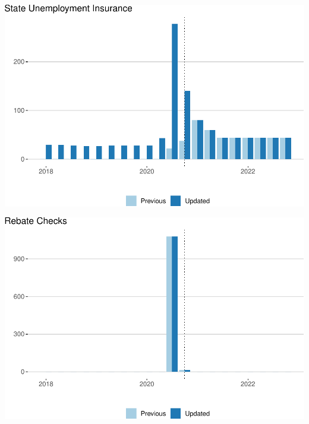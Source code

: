 \documentclass[
]{article}
\begin{document}
\begin{center}\includegraphics{update-changes-levels_files/figure-latex/state_unemployment_insurance-1} \end{center}

\begin{center}\includegraphics{update-changes-levels_files/figure-latex/rebate_checks-1} \end{center}
\end{document}
